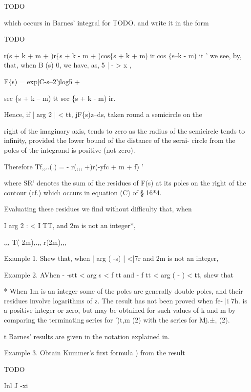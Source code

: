 TODO

which occurs in Barnes' integral for TODO. and write it in the form

TODO

r(s + k + m + )r\{s + k - m + )cos\{s + k + m) ir cos \{s--k - m)
it ' we see, by, that, when B (s)  0, we have, as, 5 | - > x
,

F\{s) = exp|C-s--2'jlog5 +

sec \{s + k -- m) tt sec \{s + k - m) ir.

Hence, if | arg 2 | <  tt, jF\{s)z--ds, taken round a semicircle
on the

right of the imaginary axis, tends to zero as the radius of the
semicircle tends to infinity, provided the lower bound of the distance
of the serai- circle from the poles of the integrand is positive (not
zero).

Therefore Tf,,..(.) = - r(,,, +)r(-yfc + m + f) '

where SR' denotes the sum of the residues of F(s) at its poles on the
right of the contour (cf.) which occurs in equation (C) of §
16*4.

Evaluating these residues we find without difficulty that, when

I arg 2 : < I TT, and 2m is not an integer*,

,,, T(-2m),.,, r(2m),,,

Example 1. Shew that, when | arg ( -s) | <|7r and 2m is not an
integer,

 Example 2. AVhen - -stt < arg s < f tt and - f tt < arg ( -
) < tt, shew that

* When 1m is an integer some of the poles are generally double poles,
and their residues involve logarithms of z. The result has not been
proved when fe- |i 7h. is a positive integer or zero, but may be
obtained for such values of k and m by comparing the terminating
series for ')t,m (2) with the series for Mj.±, (2).

t Barnes' results are given in the notation explained in.

%
%

Example 3. Obtain Kummer's first formula ) from the result

TODO 

Inl J -xi


